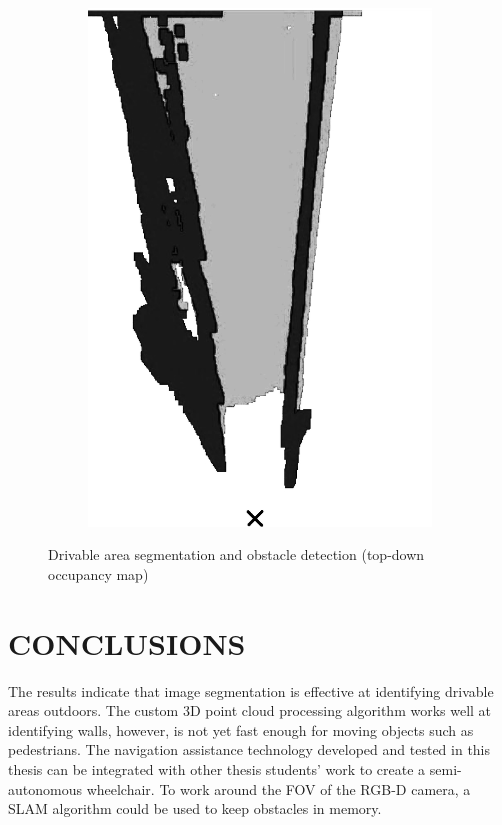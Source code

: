\documentclass[10pt,twoside]{article}
\begin{document}
\begin{figure}[H]
\begin{subfigure}{.2\textwidth}
        \includegraphics[width=\linewidth,frame]{images/map_gs.png}
    \end{subfigure}
    \caption{Drivable area segmentation and obstacle detection (top-down occupancy map)}
    \label{fig:algorithm}
\end{figure}


\section*{\textbf{CONCLUSIONS}} %
The results indicate that image segmentation is effective at identifying drivable areas outdoors.
The custom 3D point cloud processing algorithm works well at identifying walls,
however, is not yet fast enough for moving objects such as pedestrians.
The navigation assistance technology developed and tested in this thesis can be integrated
with other thesis students' work to create a semi-autonomous wheelchair. To work around the FOV
of the RGB-D camera, a SLAM algorithm could be used to keep obstacles in memory.
\end{document}
